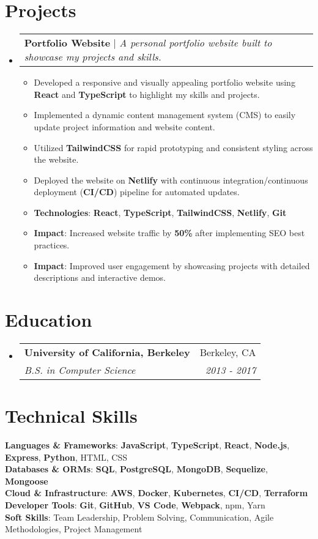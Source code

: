 \documentclass[letterpaper,11pt]{article}
\makeatletter
\newcommand{\resumeItem}[1]{
  \item\small{
    {#1 \vspace{-2pt}}
  }
}
\newcommand{\resumeSubheading}[4]{
  \vspace{-2pt}\item
    \begin{tabular*}{0.97\textwidth}[t]{l@{\extracolsep{\fill}}r}
      \textbf{#1} & #2 \\
      \textit{\small#3} & \textit{\small #4} \\
    \end{tabular*}\vspace{-7pt}
}
\newcommand{\resumeProjectHeading}[2]{
    \item
    \begin{tabular*}{0.97\textwidth}{l@{\extracolsep{\fill}}r}
      \small#1 & #2 \\
    \end{tabular*}\vspace{-7pt}
}
\newcommand{\resumeSubHeadingListStart}{\begin{itemize}[leftmargin=0.15in, label={}]}
\newcommand{\resumeSubHeadingListEnd}{\end{itemize}}
\newcommand{\resumeItemListStart}{\begin{itemize}}
\newcommand{\resumeItemListEnd}{\end{itemize}\vspace{-5pt}}
\makeatother
\begin{document}
\section{Projects}
\resumeSubHeadingListStart
    \resumeProjectHeading
        {\textbf{Portfolio Website} $|$ \emph{A personal portfolio website built to showcase my projects and skills.}}{}
        \resumeItemListStart
            \resumeItem{Developed a responsive and visually appealing portfolio website using \textbf{React} and \textbf{TypeScript} to highlight my skills and projects.}
            \resumeItem{Implemented a dynamic content management system (CMS) to easily update project information and website content.}
            \resumeItem{Utilized \textbf{TailwindCSS} for rapid prototyping and consistent styling across the website.}
            \resumeItem{Deployed the website on \textbf{Netlify} with continuous integration/continuous deployment (\textbf{CI/CD}) pipeline for automated updates.}
            \resumeItem{\textbf{Technologies}: \textbf{React}, \textbf{TypeScript}, \textbf{TailwindCSS}, \textbf{Netlify}, \textbf{Git}}
            \resumeItem{\textbf{Impact}: Increased website traffic by \textbf{50\%} after implementing SEO best practices.}
            \resumeItem{\textbf{Impact}: Improved user engagement by showcasing projects with detailed descriptions and interactive demos.}
        \resumeItemListEnd
\resumeSubHeadingListEnd

\section{Education}
\resumeSubHeadingListStart
    \resumeSubheading
      {University of California, Berkeley}{Berkeley, CA}
      {B.S. in Computer Science}{2013 - 2017}
\resumeSubHeadingListEnd

\section{Technical Skills}
\begin{itemize}[leftmargin=0.15in, label={}]
    \small{\item{
     \textbf{Languages \& Frameworks}{: \textbf{JavaScript}, \textbf{TypeScript}, \textbf{React}, \textbf{Node.js}, \textbf{Express}, \textbf{Python}, HTML, CSS} \\
     \textbf{Databases \& ORMs}{: \textbf{SQL}, \textbf{PostgreSQL}, \textbf{MongoDB}, \textbf{Sequelize}, \textbf{Mongoose}} \\
     \textbf{Cloud \& Infrastructure}{: \textbf{AWS}, \textbf{Docker}, \textbf{Kubernetes}, \textbf{CI/CD}, \textbf{Terraform}} \\
     \textbf{Developer Tools}{: \textbf{Git}, \textbf{GitHub}, \textbf{VS Code}, \textbf{Webpack}, npm, Yarn} \\
     \textbf{Soft Skills}{: Team Leadership, Problem Solving, Communication, Agile Methodologies, Project Management}
    }}
\end{itemize}
\end{document}
